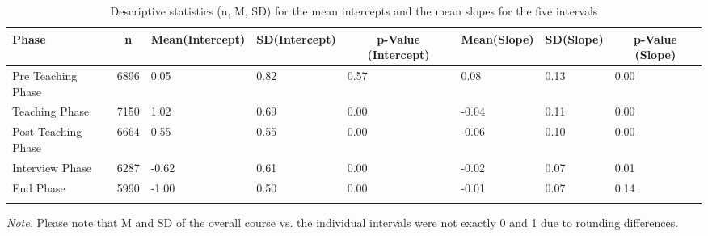 


\begin{table}[h]

\begin{center}
\begin{threeparttable}

\caption{\label{tab:unnamed-chunk-2}Descriptive statistics (n, M, SD) for the mean intercepts and the mean slopes for the five intervals}

\begin{tabular}{llllllll}
\toprule
Phase & \multicolumn{1}{c}{n} & \multicolumn{1}{c}{Mean(Intercept)} & \multicolumn{1}{c}{SD(Intercept)} & \multicolumn{1}{c}{p-Value (Intercept)} & \multicolumn{1}{c}{Mean(Slope)} & \multicolumn{1}{c}{SD(Slope)} & \multicolumn{1}{c}{p-Value (Slope)}\\
\midrule
Pre Teaching Phase & 6896 & 0.05 & 0.82 & 0.57 & 0.08 & 0.13 & 0.00\\
Teaching Phase & 7150 & 1.02 & 0.69 & 0.00 & -0.04 & 0.11 & 0.00\\
Post Teaching Phase & 6664 & 0.55 & 0.55 & 0.00 & -0.06 & 0.10 & 0.00\\
Interview Phase & 6287 & -0.62 & 0.61 & 0.00 & -0.02 & 0.07 & 0.01\\
End Phase & 5990 & -1.00 & 0.50 & 0.00 & -0.01 & 0.07 & 0.14\\
\bottomrule
\addlinespace
\end{tabular}

\begin{tablenotes}[para]
\normalsize{\textit{Note.} Please note that M and SD of the overall course vs. the individual intervals were not exactly 0 and 1 due to rounding differences.}
\end{tablenotes}

\end{threeparttable}
\end{center}

\end{table}



